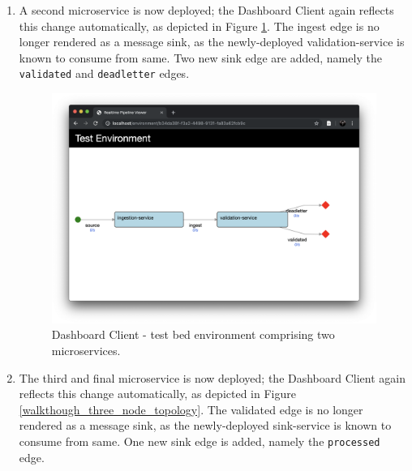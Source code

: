 \begin{enumerate}
\item A second microservice is now deployed; the Dashboard Client again reflects this change automatically, as depicted in Figure \ref{walkthough_two_node_topology}. The ingest edge is no longer rendered as a message sink, as the newly-deployed validation-service is known to consume from same. Two new sink edge are added, namely the \texttt{validated} and \texttt{deadletter} edges.

\begin{figure}[H]
	\centering  
	\includegraphics[scale=0.3]{figures/walkthrough/env-two-nodes.png}
	\caption{Dashboard Client - test bed environment comprising two microservices.}
	\label{walkthough_two_node_topology}
\end{figure}

\item The third and final microservice is now deployed; the Dashboard Client again reflects this change automatically, as depicted in Figure \ref{walkthough_three_node_topology}. The validated edge is no longer rendered as a message sink, as the newly-deployed sink-service is known to consume from same. One new sink edge is added, namely the \texttt{processed} edge.


\end{enumerate}
